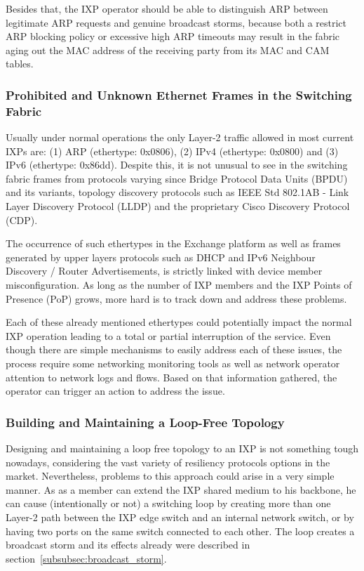 \documentclass[conference]{IEEEtran/IEEEtran}
\begin{document}
Besides that, the IXP operator should be able to distinguish ARP between legitimate ARP requests and genuine broadcast storms, because both a restrict ARP blocking policy or excessive high ARP timeouts may result in the fabric aging out the MAC address of the receiving party from its MAC and CAM tables.

\subsubsection{Prohibited and Unknown Ethernet Frames in the Switching Fabric}
Usually under normal operations the only Layer-2 traffic allowed in most current IXPs are: (1) ARP (ethertype: 0x0806), (2) IPv4 (ethertype: 0x0800) and (3) IPv6 (ethertype: 0x86dd). Despite this, it is not unusual to see in the switching fabric frames from protocols varying since Bridge Protocol Data Units (BPDU) and its variants, topology discovery protocols such as IEEE Std 802.1AB - Link Layer Discovery Protocol (LLDP) and the proprietary Cisco Discovery Protocol (CDP). 

The occurrence of such ethertypes in the Exchange platform as well as frames generated by upper layers protocols such as DHCP and IPv6 Neighbour Discovery / Router Advertisements, is strictly linked with device member misconfiguration. As long as the number of IXP members and the IXP Points of Presence (PoP) grows, more hard is to track down and address these problems. 

Each of these already mentioned ethertypes could potentially impact the normal IXP operation leading to a total or partial interruption of the service. Even though there are simple mechanisms to easily address each of these issues, the process require some networking monitoring tools as well as network operator attention to network logs and flows. Based on that information gathered, the operator can trigger an action to address the issue. 

\subsubsection{Building and Maintaining a Loop-Free Topology}
Designing and maintaining a loop free topology to an IXP is not something tough nowadays, considering the vast variety of resiliency protocols options in the market. Nevertheless, problems to this approach could arise in a very simple manner. As as a member can extend the IXP shared medium to his backbone, he can cause (intentionally or not) a switching loop by creating more than one Layer-2 path between the IXP edge switch and an internal network switch, or by having two ports on the same switch connected to each other. The loop creates a broadcast storm and its effects already were described in section~\ref{subsubsec:broadcast_storm}.
\end{document}
